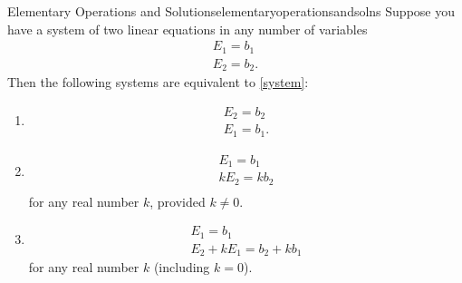 \begin{theorem}{Elementary Operations and Solutions}{elementaryoperationsandsolns}
Suppose you have a system of two linear equations in any number of variables
\begin{equation}
 \begin{array}{c}
  E_{1}=b_{1}\\
  E_{2}=b_{2}.
\end{array} \label{system}
\end{equation}
Then the following systems are equivalent to \eqref{system}: 
\begin{enumerate}
\item   \begin{equation}
	\begin{array}{c}
	E_{2}=b_{2}\\
	E_{1}=b_{1}.
	\end{array}
	\label{thm1.9.1}
	\end{equation}
\item  \begin{equation}
	\begin{array}{c}
	E_{1}=b_{1} \\
	kE_{2}=kb_{2}\\        
	\end{array}
	\label{thm1.9.2}
	\end{equation}
  for any real number $k$, provided $k\neq0$.
\item \begin{equation}
      \begin{array}{c}
       E_{1}=b_{1} \\
       E_{2}+kE_{1}=b_{2}+kb_{1}
       \end{array}  
	\label{thm1.9.3}
	\end{equation}
	for any real number  $k$ (including $k=0$).

\end{enumerate}
\end{theorem}

